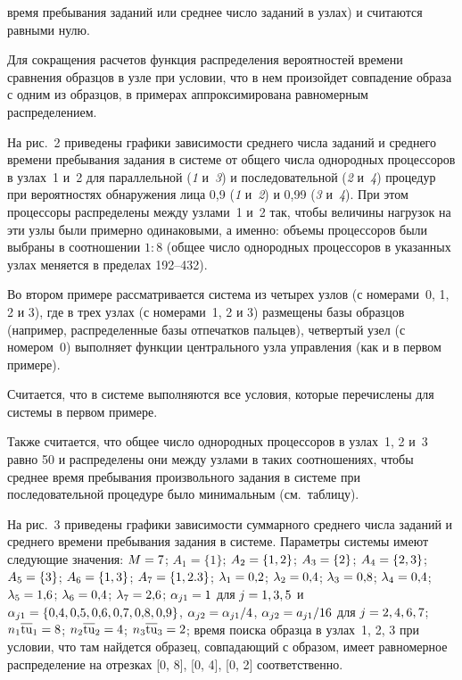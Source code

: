 \begin{multicols}{2}
\begin{itemize}
\pagebreak

\noindent
время пребывания заданий или среднее число заданий в узлах) и
считаются равными нулю.
  \end{itemize}

  Для сокращения расчетов функция распределения вероятностей времени
сравнения образцов в узле при условии, что в нем произойдет совпадение
образа с одним из образцов, в примерах аппроксимирована равномерным
распределением.

На рис.~2 приведены графики зависимости среднего числа
заданий и среднего времени пребывания задания в системе от общего числа
однородных процессоров в узлах~1 и~2 для параллельной (\textit{1}
и~\textit{3}) и последовательной (\textit{2} и~\textit{4}) процедур при
вероятностях обнаружения лица 0,9 (\textit{1} и~\textit{2}) и 0,99
(\textit{3} и~\textit{4}). При этом процессоры распределены между
узлами~1 и~2 так, чтобы величины нагрузок на эти узлы были примерно
одинаковыми, а именно: объемы процессоров были выбраны в соотношении $1:8$
(общее число однородных процессоров в указанных узлах меняется в пределах
192--432).



	Во втором примере рассматривается система из четырех узлов (с
номерами~0, 1, 2 и 3), где в трех узлах (с номерами~1, 2 и 3) размещены базы
образцов (например, распределенные базы отпечатков пальцев), четвертый узел
(с номером~0) выполняет функции центрального узла управления (как и в
первом примере).

Считается, что в системе выполняются все условия, которые
перечислены для системы в первом примере.

Также считается, что общее число
однородных процессоров в узлах~1, 2 и~3 равно 50 и распределены они между
узлами в таких соотношениях, чтобы среднее время пребывания произвольного
задания в системе при последовательной процедуре было минимальным (см.\
таблицу).



     На рис.~3 приведены графики зависимости
суммарного среднего числа заданий и среднего времени пребывания задания в
системе.	Параметры системы имеют следующие значения: $M\hm=7$;
$A_1=\{1\}$; $A_2\hm= \{1,2\}$; $A_3\hm= \{2\}$; $A_4\hm= \{2,3\}$;
$A_5\hm= \{3\}$; $A_6\hm= \{1,3\}$; $A_7\hm= \{1,2.3\}$;
$\lambda_1\hm =0{,}2$; $\lambda_2\hm= 0{,}4$; $\lambda_3\hm= 0{,}8$;
$\lambda_4\hm= 0{,}4$; $\lambda_5\hm= 1{,}6$; $\lambda_6\hm= 0{,}4$;
$\lambda_7\hm= 2{,}6$; $\alpha_{j1}\hm=1$ для $j\hm= 1,3,5$ и
$\alpha_{j1}\hm= \{0{,}4, 0{,}5, 0{,}6, 0{,}7, 0{,}8, 0{,}9\}$, $\alpha_{j2}\hm=
\alpha_{j1}/4$, $\alpha_{j2}\hm= a_{j1}/16$  для $j\hm= 2,4,6,7$;
$n_1\overline{\mbox{tu}}_1\hm= 8$; $n_2\overline{\mbox{tu}}_2\hm= 4$;
$n_3\overline{\mbox{tu}}_3\hm=2$; время поиска образца в узлах~1, 2, 3 при условии,
что там найдется образец, совпадающий с образом, имеет равномерное
распределение на отрезках [0, 8], [0, 4], [0, 2] соответственно.




\end{multicols}

